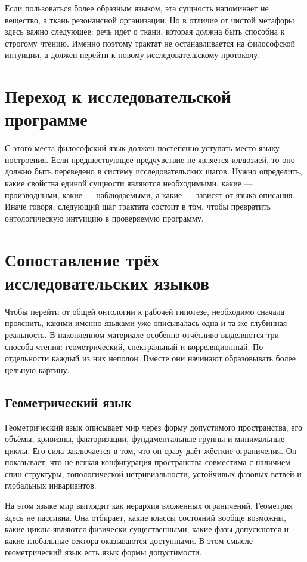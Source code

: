 \documentclass[12pt,a4paper]{article}
\begin{document}
Если пользоваться более образным языком, эта сущность напоминает не вещество, а ткань резонансной организации. Но в отличие от чистой метафоры здесь важно следующее: речь идёт о ткани, которая должна быть способна к строгому чтению. Именно поэтому трактат не останавливается на философской интуиции, а должен перейти к новому исследовательскому протоколу.

\section{Переход к исследовательской программе}

С этого места философский язык должен постепенно уступать место языку построения. Если предшествующее предчувствие не является иллюзией, то оно должно быть переведено в систему исследовательских шагов. Нужно определить, какие свойства единой сущности являются необходимыми, какие --- производными, какие --- наблюдаемыми, а какие --- зависят от языка описания. Иначе говоря, следующий шаг трактата состоит в том, чтобы превратить онтологическую интуицию в проверяемую программу.

\section{Сопоставление трёх исследовательских языков}

Чтобы перейти от общей онтологии к рабочей гипотезе, необходимо сначала прояснить, какими именно языками уже описывалась одна и та же глубинная реальность. В накопленном материале особенно отчётливо выделяются три способа чтения: геометрический, спектральный и корреляционный. По отдельности каждый из них неполон. Вместе они начинают образовывать более цельную картину.

\subsection{Геометрический язык}

Геометрический язык описывает мир через форму допустимого пространства, его объёмы, кривизны, факторизации, фундаментальные группы и минимальные циклы. Его сила заключается в том, что он сразу даёт жёсткие ограничения. Он показывает, что не всякая конфигурация пространства совместима с наличием спин-структуры, топологической нетривиальности, устойчивых фазовых ветвей и глобальных инвариантов.

На этом языке мир выглядит как иерархия вложенных ограничений. Геометрия здесь не пассивна. Она отбирает, какие классы состояний вообще возможны, какие циклы являются физически существенными, какие фазы допускаются и какие глобальные сектора оказываются доступными. В этом смысле геометрический язык есть язык формы допустимости.
\end{document}
